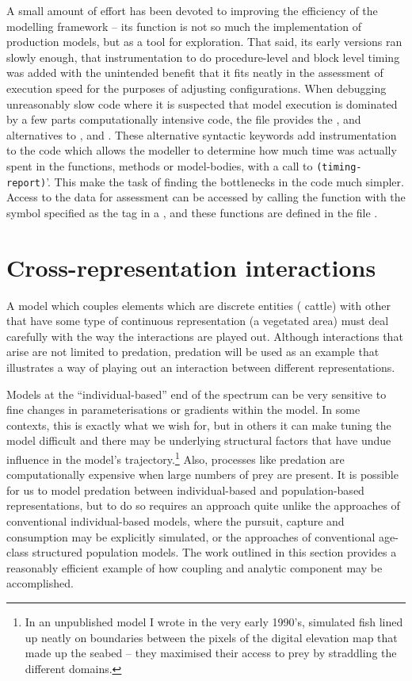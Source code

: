 \vspace{3mm}
A small amount of effort has been devoted to improving the efficiency
of the modelling framework -- its function is not so much the
implementation of production models, but as a tool for exploration.
That said, its early versions ran slowly enough, that instrumentation
to do procedure-level and block level timing was added with the
unintended benefit that it fits neatly in the assessment of execution
speed for the purposes of adjusting configurations.  When debugging
unreasonably slow code where it is suspected that model execution is
dominated by a few parts computationally intensive code,  the
 file provides the ,
 and 
alternatives to ,  and
. These alternative syntactic keywords add
instrumentation to the code which allows the modeller to determine how
much time was actually spent in the functions, methods or
model-bodies, with a call to \texttt{(timing-report)}'. This make the
task of finding the bottlenecks in the code much simpler.  Access to
the data for assessment can be accessed by calling the
function  with the symbol specified as the tag in
a , and these functions are defined in the
file . 


\section{Cross-representation interactions\label{predation5}}

A model which couples elements which are discrete entities (\eg
cattle) with other that have some type of continuous representation
(\eg a vegetated area) must deal carefully with the way the
interactions are played out. Although interactions that arise are not
limited to predation, predation will be used as an example that
illustrates a way of playing out an interaction between different
representations. 

Models at the ``individual-based'' end of the spectrum can be very
sensitive to fine changes in parameterisations or gradients within the
model.  In some contexts, this is exactly what we wish for, but in
others it can make tuning the model difficult and there may be
underlying structural factors that have undue influence in the model's
trajectory.\footnote{In an unpublished model I wrote in the very early
1990's, simulated fish lined up neatly on boundaries between the
pixels of the digital elevation map that made up the seabed -- they
maximised their access to prey by straddling the different domains.}
Also, processes like predation are computationally expensive when
large numbers of prey are present.  It is possible for us to model
predation between individual-based and population-based
representations, but to do so requires an approach quite unlike the
approaches of conventional individual-based models, where the pursuit,
capture and consumption may be explicitly simulated, or the approaches
of conventional age-class structured population models.  The work
outlined in this section provides a reasonably efficient example of
how coupling and analytic component may be accomplished.

